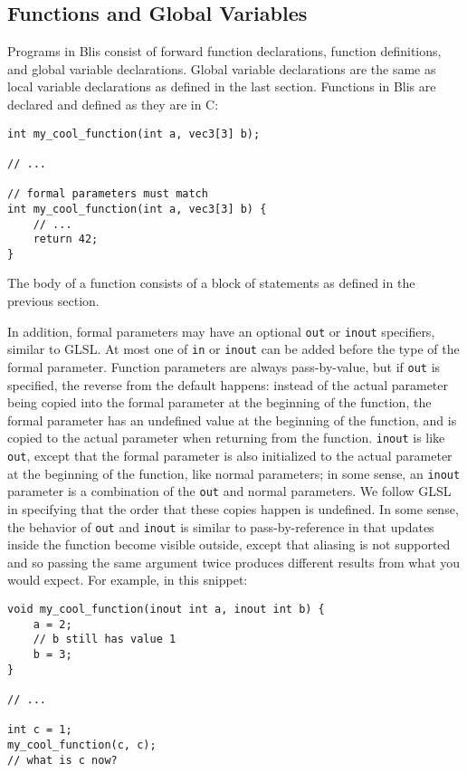 \documentclass[11pt]{article}
\newcommand{\code}[1]{\texttt{#1}}
\begin{document}
\subsection{Functions and Global Variables}

Programs in Blis consist of forward function declarations, function definitions, and global variable declarations. Global variable declarations are the same as local variable declarations as defined in the last section. Functions in Blis are declared and defined as they are in C:

\begin{lstlisting}
int my_cool_function(int a, vec3[3] b);

// ...

// formal parameters must match
int my_cool_function(int a, vec3[3] b) {
    // ...
    return 42;
}
\end{lstlisting}

The body of a function consists of a block of statements as defined in the previous section.

In addition, formal parameters may have an optional \code{out} or \code{inout} specifiers, similar to GLSL. At most one of \code{in} or \code{inout} can be added before the type of the formal parameter. Function parameters are always pass-by-value, but if \code{out} is specified, the reverse from the default happens: instead of the actual parameter being copied into the formal parameter at the beginning of the function, the formal parameter has an undefined value at the beginning of the function, and is copied to the actual parameter when returning from the function. \code{inout} is like \code{out}, except that the formal parameter is also initialized to the actual parameter at the beginning of the function, like normal parameters; in some sense, an \code{inout} parameter is a combination of the \code{out} and normal parameters. We follow GLSL in specifying that the order that these copies happen is undefined. In some sense, the behavior of \code{out} and \code{inout} is similar to pass-by-reference in that updates inside the function become visible outside, except that aliasing is not supported and so passing the same argument twice produces different results from what you would expect. For example, in this snippet:

\begin{lstlisting}
void my_cool_function(inout int a, inout int b) {
    a = 2;
    // b still has value 1
    b = 3;
}

// ...

int c = 1;
my_cool_function(c, c);
// what is c now?
\end{lstlisting}
\end{document}
